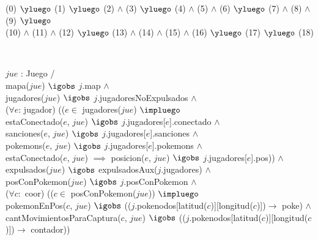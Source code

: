 \begin{Representacion}
%
{(0) $\yluego$ (1) $\yluego$ (2) $\land$ (3) $\yluego$ (4) $\land$ (5) $\land$ (6) $\yluego$ (7) $\land$ (8) $\land$ (9) $\yluego$\\
 (10) $\land$ (11) $\land$ (12) $\yluego$ (13) $\land$ (14) $\land$ (15) $\land$ (16) $\yluego$ (17) $\yluego$ (18)}

$ $\newline
$ $\newline



%
{
$jue$ : Juego / \\
  mapa($jue$) $\igobs$ $j$.map $\land$ \\
  jugadores($jue$) $\igobs$ $j$.jugadoresNoExpulsados $\land$ \\ 

  ($\forall e$: jugador) (($e \in$ jugadores($jue$) $\impluego$ \\
    estaConectado($e$, $jue$) $\igobs$ $j$.jugadores[$e$].conectado $\land$ \\
    sanciones($e$, $jue$) $\igobs$ $j$.jugadores[$e$].sanciones $\land$ \\
    pokemons($e$, $jue$) $\igobs$ $j$.jugadores[$e$].pokemons $\land$ \\
    estaConectado($e$, $jue$) $\implies$ posicion($e$, $jue$) $\igobs$ $j$.jugadores[$e$].pos)) $\land$ \\

  expulsados($jue$) $\igobs$ expulsadosAux($j$.jugadores) $\land$ \\
  posConPokemon($jue$) $\igobs$ $j$.posConPokemon $\land$ \\
  
  ($\forall c:$ coor) (($c \in$ posConPokemon($jue$)) $\impluego$ \\
    pokemonEnPos($c$, $jue$) $\igobs$ (($j$.pokenodos[latitud($c$)][longitud($c$)])$ \rightarrow$ poke) $\land$ \\
    cantMovimientosParaCaptura($c$, $jue$) $\igobs$ (($j$.pokenodos[latitud($c$)][longitud($c$)])$ \rightarrow$ contador))
}%

\end{Representacion}

